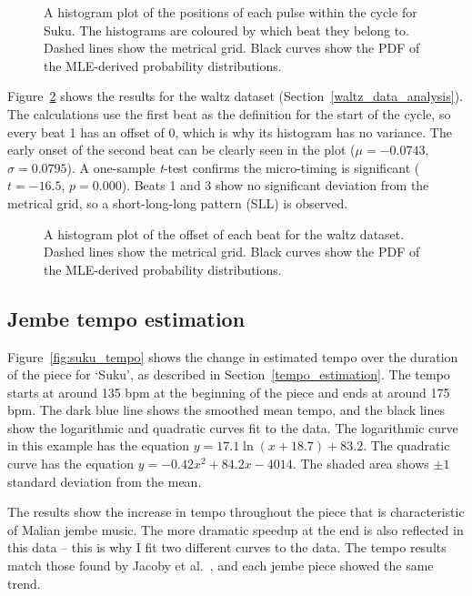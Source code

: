 \documentclass[12pt,twoside,openright]{report}
\begin{document}
\begin{figure}[ht]
    \centering
    
    \caption{A histogram plot of the positions of each pulse within the cycle for Suku. The histograms are coloured by which beat they belong to. Dashed lines show the metrical grid. Black curves show the PDF of the MLE-derived probability distributions.}
    \label{fig:suku_histogram}
\end{figure}

Figure~\ref{fig:waltz_histogram} shows the results for the waltz dataset (Section~\ref{waltz_data_analysis}). The calculations
use the first beat as the definition for the start of the cycle, so every beat 1
has an offset of 0, which is why its histogram has no variance. The early onset
of the second beat can be clearly seen in the plot ($\mu=-0.0743$, $\sigma=0.0795$). A
one-sample \textit{t}-test confirms the micro-timing is significant ($t=-16.5$, $p=0.000$). Beats 1 and 3 show no significant deviation from the metrical grid, so a short-long-long pattern (SLL) is observed.

\begin{figure}[ht]
    \centering
    
    \caption{A histogram plot of the offset of each beat for the waltz dataset. Dashed lines show the metrical grid. Black curves show the PDF of the MLE-derived probability distributions.}
    \label{fig:waltz_histogram}
\end{figure}


\subsection{Jembe tempo estimation} \label{jembe_tempo_estimation_results}

Figure~\ref{fig:suku_tempo} shows the change in estimated tempo over the duration of the piece for
`Suku', as described in Section~\ref{tempo_estimation}. The tempo starts at around 135 bpm at the beginning of the piece and
ends at around 175 bpm. The dark blue line shows the smoothed mean tempo, and
the black lines show the logarithmic and quadratic curves fit to the data. The
logarithmic curve in this example has the equation $y=17.1 \ln(x+18.7)+83.2$.
The quadratic curve has the equation $y=-0.42x^2+84.2x-4014$. The
shaded area shows $\pm1$ standard deviation from the mean.

The results show the increase in tempo throughout the piece that is characteristic of Malian jembe music. The more dramatic speedup at the end is also reflected in this data -- this is why I fit two different curves to the data. The tempo results match those found by Jacoby et al.\ \cite{jacoby2021supp}, and each jembe piece showed the same trend.
\end{document}
